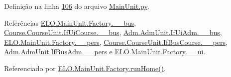 Definição na linha \hyperlink{MainUnit_8py_source_l00106}{106} do arquivo \hyperlink{MainUnit_8py_source}{Main\+Unit.\+py}.



Referências \hyperlink{MainUnit_8py_source_l00044}{E\+L\+O.\+Main\+Unit.\+Factory.\+\_\+\+\_\+bus}, \hyperlink{CourseUnit_8py_source_l00055}{Course.\+Course\+Unit.\+If\+Ui\+Course.\+\_\+\+\_\+bus}, \hyperlink{AdmUnit_8py_source_l00067}{Adm.\+Adm\+Unit.\+If\+Ui\+Adm.\+\_\+\+\_\+bus}, \hyperlink{MainUnit_8py_source_l00045}{E\+L\+O.\+Main\+Unit.\+Factory.\+\_\+\+\_\+pers}, \hyperlink{CourseUnit_8py_source_l00099}{Course.\+Course\+Unit.\+If\+Bus\+Course.\+\_\+\+\_\+pers}, \hyperlink{AdmUnit_8py_source_l00112}{Adm.\+Adm\+Unit.\+If\+Bus\+Adm.\+\_\+\+\_\+pers} e \hyperlink{MainUnit_8py_source_l00043}{E\+L\+O.\+Main\+Unit.\+Factory.\+\_\+\+\_\+ui}.



Referenciado por \hyperlink{classELO_1_1MainUnit_1_1Factory_abb90458d8f89dd0fbfefcab94e9f023f}{E\+L\+O.\+Main\+Unit.\+Factory.\+run\+Home()}.


